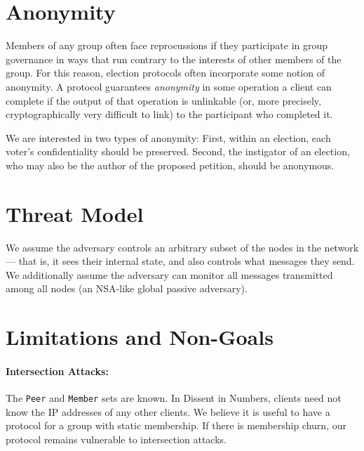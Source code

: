 \section{Anonymity}
Members of any group often face reprocussions if they participate in group
governance in ways that run contrary to the interests of other members of
the group. For this reason, election protocols often incorporate some notion
of anonymity. A protocol guarantees \emph{anonymity} in some operation a
client can complete if the output of that operation is unlinkable (or, more
precisely, cryptographically very difficult to link) to the participant who
completed it\cite{ford_hiding_2014}.

We are interested in two types of anonymity: First, within an election,
each voter's confidentiality should be preserved. Second, the instigator of an
election, who may also be the author of the proposed petition, should be
anonymous.

\section{Threat Model}
We assume the adversary controls an arbitrary subset of the nodes in the network
--- that is, it sees their internal state, and also controls what messages they
send. We additionally assume the adversary can monitor all messages transmitted
among all nodes (an NSA-like global passive adversary).

\section{Limitations and Non-Goals}
  \paragraph{Intersection Attacks:} The \texttt{Peer} and \texttt{Member} sets
  are known. In Dissent in Numbers, clients need not know the IP addresses of
  any other clients. We believe it is useful to have a protocol for a group with
  static membership.  If there is membership churn, our protocol remains
  vulnerable to intersection attacks.
